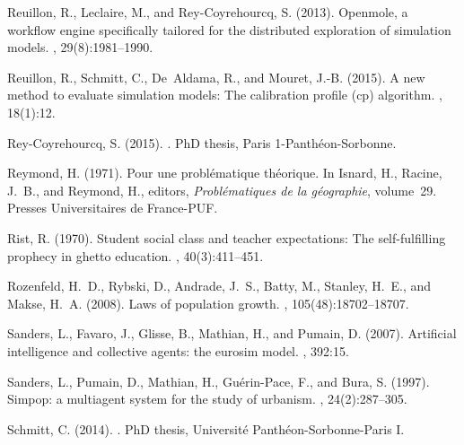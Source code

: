 \documentclass[10pt]{article}
\begin{document}
\begin{thebibliography}{}
Reuillon, R., Leclaire, M., and Rey-Coyrehourcq, S. (2013).
\newblock Openmole, a workflow engine specifically tailored for the distributed
  exploration of simulation models.
, 29(8):1981--1990.

Reuillon, R., Schmitt, C., De~Aldama, R., and Mouret, J.-B. (2015).
\newblock A new method to evaluate simulation models: The calibration profile
  (cp) algorithm.
,
  18(1):12.

Rey-Coyrehourcq, S. (2015).
.
\newblock PhD thesis, Paris 1-Panth{\'e}on-Sorbonne.

Reymond, H. (1971).
\newblock Pour une problématique théorique.
\newblock In Isnard, H., Racine, J.~B., and Reymond, H., editors, {\em
  Probl{\'e}matiques de la g{\'e}ographie}, volume~29. Presses Universitaires
  de France-PUF.

Rist, R. (1970).
\newblock Student social class and teacher expectations: The self-fulfilling
  prophecy in ghetto education.
, 40(3):411--451.

Rozenfeld, H.~D., Rybski, D., Andrade, J.~S., Batty, M., Stanley, H.~E., and
  Makse, H.~A. (2008).
\newblock Laws of population growth.
,
  105(48):18702--18707.

Sanders, L., Favaro, J., Glisse, B., Mathian, H., and Pumain, D. (2007).
\newblock Artificial intelligence and collective agents: the eurosim model.
, 392:15.

Sanders, L., Pumain, D., Mathian, H., Gu{\'e}rin-Pace, F., and Bura, S. (1997).
\newblock Simpop: a multiagent system for the study of urbanism.
,
  24(2):287--305.

Schmitt, C. (2014).
.
\newblock PhD thesis, Universit{\'e} Panth{\'e}on-Sorbonne-Paris I.


\end{thebibliography}
\end{document}
